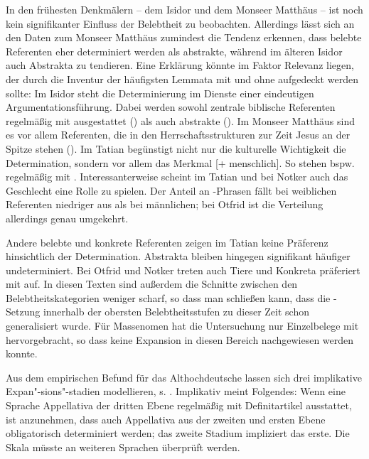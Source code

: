 In den frühesten Denkmälern -- dem Isidor und dem Monseer Matthäus -- ist noch kein signifikanter Einfluss der Belebtheit zu beobachten. Allerdings lässt sich an den Daten zum Monseer Matthäus zumindest die Tendenz erkennen, dass belebte Referenten eher determiniert werden als abstrakte, während im älteren Isidor auch Abstrakta zu  tendieren. Eine Erklärung könnte im Faktor Relevanz liegen, der durch die Inventur der häufigsten Lemmata mit und ohne  aufgedeckt werden sollte:  Im Isidor steht die Determinierung im Dienste einer eindeutigen Argumentationsführung. Dabei werden sowohl zentrale biblische Referenten regelmäßig mit  ausgestattet () als auch abstrakte (). Im Monseer Matthäus sind es vor allem Referenten, die in den Herrschaftsstrukturen zur Zeit Jesus an der Spitze stehen (). Im Tatian begünstigt nicht nur die kulturelle Wichtigkeit die Determination, sondern vor allem das Merkmal [+ menschlich]. So stehen bspw.  regelmäßig mit . Interessanterweise scheint im Tatian und bei Notker auch das Geschlecht eine Rolle zu spielen. Der Anteil an -Phrasen fällt bei weiblichen Referenten niedriger aus als bei männlichen; bei Otfrid ist die Verteilung allerdings genau umgekehrt.

Andere belebte und konkrete Referenten zeigen im Tatian keine Präferenz hinsichtlich der Determination. Abstrakta bleiben hingegen signifikant häufiger undeterminiert. Bei Otfrid und Notker treten auch Tiere und Konkreta präferiert mit  auf. In diesen Texten sind außerdem die Schnitte zwischen den Belebtheitskategorien weniger scharf, so dass man schließen kann, dass die -Setzung innerhalb der obersten Belebtheitsstufen zu dieser Zeit schon generalisiert wurde. Für Massenomen hat die Untersuchung nur Einzelbelege mit  hervorgebracht, so dass keine Expansion in diesen Bereich nachgewiesen werden konnte.  

Aus dem empirischen Befund für das Althochdeutsche lassen sich drei implikative Expan"-sions"-stadien modellieren, s. . Implikativ meint Folgendes:  
Wenn eine Sprache Appellativa der dritten Ebene regelmäßig mit Definitartikel ausstattet, ist anzunehmen, dass auch Appellativa aus der zweiten und ersten Ebene obligatorisch determiniert werden; das zweite Stadium impliziert das erste. Die Skala müsste an weiteren Sprachen überprüft werden.  

